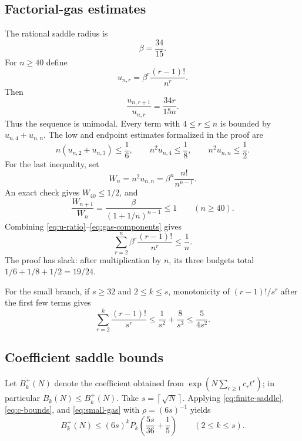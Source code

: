 \documentclass[11pt]{article}
\theoremstyle{definition}
\theoremstyle{remark}
\newcommand{\ceil}[1]{\left\lceil #1\right\rceil}
\begin{document}
\subsection{Factorial-gas estimates}

The rational saddle radius is
\begin{equation}\label{eq:beta}
  \beta=\frac{34}{15}.
\end{equation}
For $n\ge40$ define
\[
 u_{n,r}=\beta^r\frac{(r-1)!}{n^r}.
\]
Then
\begin{equation}\label{eq:u-ratio}
  \frac{u_{n,r+1}}{u_{n,r}}=\frac{34r}{15n}.
\end{equation}
Thus the sequence is unimodal.  Every term with $4\le r\le n$ is bounded by
$u_{n,4}+u_{n,n}$.  The low and endpoint estimates formalized in the proof
are
\begin{equation}\label{eq:gas-components}
 n(u_{n,2}+u_{n,3})\le\frac16,
 \qquad n^2u_{n,4}\le\frac18,
 \qquad n^2u_{n,n}\le\frac12.
\end{equation}
For the last inequality, set
\[
 W_n=n^2u_{n,n}=\beta^n\frac{n!}{n^{n-1}}.
\]
An exact check gives $W_{40}\le1/2$, and
\[
 \frac{W_{n+1}}{W_n}
 =\frac{\beta}{(1+1/n)^{n-1}}\le1
 \qquad(n\ge40).
\]
Combining \eqref{eq:u-ratio}--\eqref{eq:gas-components} gives
\begin{equation}\label{eq:tempered-gas}
  \sum_{r=2}^n\beta^r\frac{(r-1)!}{n^r}
  \le\frac1n.
\end{equation}
The proof has slack: after multiplication by $n$, its three budgets total
$1/6+1/8+1/2=19/24$.

For the small branch, if $s\ge32$ and $2\le k\le s$, monotonicity of
$(r-1)!/s^r$ after the first few terms gives
\begin{equation}\label{eq:small-gas}
  \sum_{r=2}^k\frac{(r-1)!}{s^r}
  \le\frac1{s^2}+\frac8{s^3}
  \le\frac5{4s^2}.
\end{equation}

\subsection{Coefficient saddle bounds}

Let $B_k^+(N)$ denote the coefficient obtained from
$\exp(N\sum_{r\ge1}c_rt^r)$; in particular $B_k(N)\le B_k^+(N)$.  Take
$s=\ceil{\sqrt N}$.  Applying \eqref{eq:finite-saddle},
\eqref{eq:c-bounds}, and \eqref{eq:small-gas} with
$\rho=(6s)^{-1}$ yields
\begin{equation}\label{eq:B-small}
  B_k^+(N)\le(6s)^k
  P_k\left(\frac{5s}{36}+\frac15\right)
  \qquad(2\le k\le s).
\end{equation}
\end{document}
